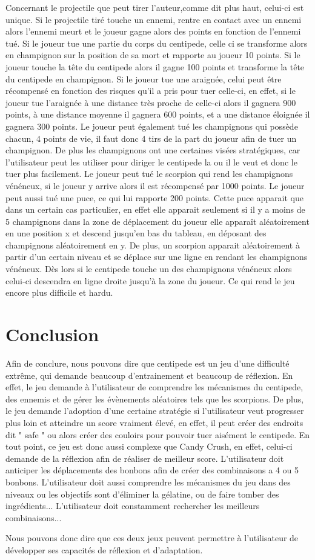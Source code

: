 Concernant le projectile que peut tirer l'auteur,comme dit plus haut, celui-ci est unique. Si le projectile tiré touche un ennemi, rentre en contact avec un ennemi alors l'ennemi meurt et le joueur gagne alors des points en fonction de l'ennemi tué. Si le joueur tue une partie du corps du centipede, celle ci se transforme alors en champignon sur la position de sa mort et rapporte au joueur 10 points. Si le joueur touche la tête du centipede alors il gagne 100 points et transforme la tête du centipede en champignon. Si le joueur tue une araignée, celui peut être récompensé en fonction des risques qu'il a pris pour tuer celle-ci, en effet, si le joueur tue l'araignée à une distance très proche de celle-ci alors il gagnera 900 points, à une distance moyenne il gagnera 600 points, et a une distance éloignée il gagnera 300 points. Le joueur peut également tué les champignons qui possède chacun, 4 points de vie, il faut donc 4 tirs de la part du joueur afin de tuer un champignon. De plus les champignons ont une certaines visées stratégiques, car l'utilisateur peut les utiliser pour diriger le centipede la ou il le veut et donc le tuer plus facilement. Le joueur peut tué le scorpion qui rend les champignons vénéneux, si le joueur y arrive alors il est récompensé par 1000 points. Le joueur peut aussi tué une puce, ce qui lui rapporte 200 points. Cette puce apparait que dans un certain cas particulier, en effet elle apparait seulement si il y a moins de 5 champignons dans la zone de déplacement du joueur elle apparaît aléatoirement en une position x et  descend jusqu'en bas du tableau, en déposant des champignons aléatoirement en y.  De plus, un scorpion apparait aléatoirement à partir d'un certain niveau et se déplace sur une ligne en rendant les champignons vénéneux. Dès lors si le centipede touche un des champignons vénéneux alors celui-ci descendra en ligne droite jusqu'à la zone du joueur. Ce qui rend le jeu encore plus difficile et hardu.

\section{Conclusion}

Afin de conclure, nous pouvons dire que centipede est un jeu d'une difficulté extrême, qui demande beaucoup d'entrainement  et beaucoup de réflexion. En effet, le jeu demande à l'utilisateur de comprendre les mécanismes du centipede, des ennemis et de gérer les évènements aléatoires tels que les scorpions. De plus, le jeu demande l'adoption d'une certaine stratégie si l'utilisateur veut progresser plus loin et atteindre un score vraiment élevé, en effet, il peut créer des endroits dit " safe " ou alors créer des couloirs pour pouvoir tuer aisément le centipede. En tout point, ce jeu est donc aussi complexe que Candy Crush, en effet, celui-ci demande de la réflexion afin de réaliser de meilleur score. L'utilisateur doit anticiper les déplacements des bonbons afin de créer des combinaisons a 4 ou 5 bonbons. L'utilisateur doit aussi comprendre les mécanismes du jeu dans des niveaux ou les objectifs sont d'éliminer la gélatine, ou de faire tomber des ingrédients... L'utilisateur doit constamment rechercher les meilleurs combinaisons... 

Nous pouvons donc dire que ces deux jeux peuvent permettre à l'utilisateur de développer ses capacités de réflexion et d'adaptation.

